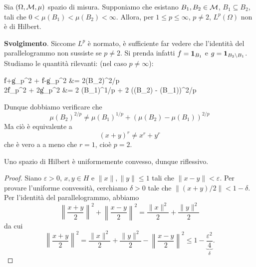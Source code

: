 \begin{exercise}
	Sia $(\Omega, \mathcal{M}, \mu)$ spazio di misura. Supponiamo che esistano $B_1, B_2 \in \mathcal{M}$, $B_1 \subseteq B_2$, tali che $0 < \mu(B_1) < \mu(B_2) < \infty$.
	Allora, per $1 \leq p \leq \infty$, $p \neq 2$, $L^p(\Omega)$ non è di Hilbert.

	\textbf{Svolgimento}.
	Siccome $L^p$ è normato, è sufficiente far vedere che l'identità del parallelogrammo non sussiste se $p \neq 2$. Si prenda infatti $f = {\boldsymbol{1}}_{B_1}$ e $g={\boldsymbol{1}}_{B_2 \setminus B_1}$.
	Studiamo le quantità rilevanti: (nel caso $p \neq \infty$):
	\begin{eqalign*}
		\|f+g\|_p^2 + \|f-g\|_p^2 &= 2\mu(B_2)^{2/p}\\
		2\|f\|_p^2 + 2\|g\|_p^2 &= 2 \mu(B_1)^{1/p} + 2 (\mu(B_2) - \mu(B_1))^{2/p}
	\end{eqalign*}
	Dunque dobbiamo verificare che
	\begin{equation*}
		\mu(B_2)^{2/p} \neq \mu(B_1)^{1/p} + (\mu(B_2) - \mu(B_1))^{2/p}
	\end{equation*}
	Ma ciò è equivalente a
	\begin{equation}
		(x+y)^r \neq x^r + y^r
	\end{equation}
	che è vero a a meno che $r=1$, cioè $p=2$.
\end{exercise}

\begin{theorem}
\label{th:hilb_reflexiv}
	Uno spazio di Hilbert è uniformemente convesso, dunque riflessivo.
\end{theorem}
\begin{proof}
	Siano $\varepsilon > 0$, $x,y \in H$ e $\|x\|, \|y\| \leq 1$ tali che $\|x-y\| < \varepsilon$. Per provare l'uniforme convessità, cerchiamo $\delta >0$ tale che $\|(x+y)/2\| < 1-\delta$.
	Per l'identità del parallelogrammo, abbiamo
	\begin{equation*}
		\left\|\frac{x+y}2\right\|^2+\left\|\frac{x-y}2\right\|^2 = \frac{\|x\|^2}2 + \frac{\|y\|^2}2
	\end{equation*}
	da cui
	\begin{equation*}
		\left\|\frac{x+y}2\right\|^2 = \frac{\|x\|^2}2 + \frac{\|y\|^2}2 - \left\|\frac{x-y}2\right\|^2 \leq 1 - \underbrace{\frac{\varepsilon^2}4}_\delta.
	\end{equation*}
\end{proof}

